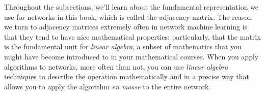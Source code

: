 Throughout the subsections, we'll learn about the fundamental representation we use for networks in this book, which is called the adjacency matrix. The reason we turn to adjacency matrices extremely often in network machine learning is that they tend to have nice mathematical properties; particularly, that the matrix is the fundamental unit for \emph{linear algebra}, a subset of mathematics that you might have become introduced to in your mathematical courses. When you apply algorithms to networks, more often than not, you can use \emph{linear algebra} techniques to describe the operation mathematically and in a precise way that allows you to apply the algorithm \emph{en masse} to the entire network.

\newpage 







